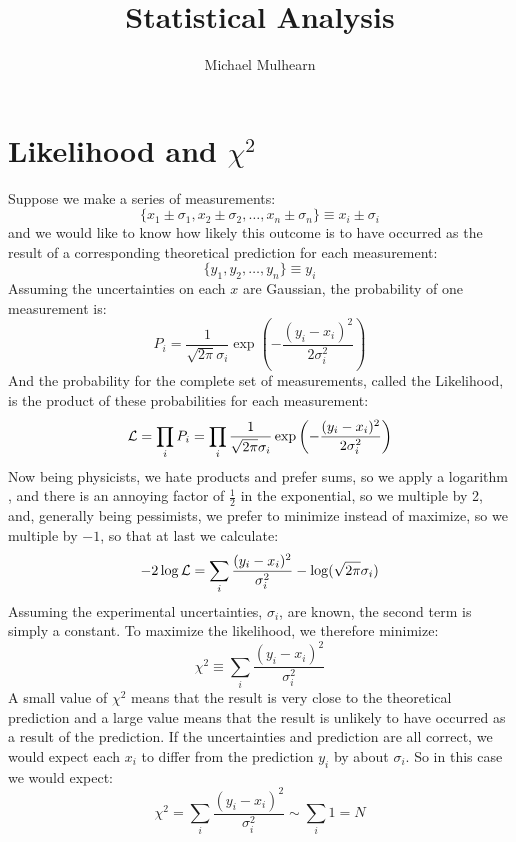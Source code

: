 \documentclass[12pt]{article}
\begin{document}
\title{Statistical Analysis}
\author{Michael Mulhearn}

\maketitle

\section{Likelihood and $\chi^2$}

Suppose we make a series of measurements:
\begin{displaymath}
\{x_1 \pm \sigma_1, x_2 \pm \sigma_2, \ldots, x_n \pm \sigma_n \} \equiv x_i \pm \sigma_i
\end{displaymath}
and we would like to know how likely this outcome is to have occurred as the result of a corresponding theoretical prediction for each measurement:
\begin{displaymath}
\{y_1, y_2, \ldots, y_n \} \equiv y_i
\end{displaymath}
Assuming the uncertainties on each $x$ are Gaussian, the probability of one measurement is:
\begin{displaymath}
P_i = \frac{1}{\sqrt{2 \pi} \sigma_i}  \exp\left( - \frac{(y_i-x_i)^2}{2\sigma_i^2}\right)
\end{displaymath}
And the probability for the complete set of measurements, called the Likelihood, is the product of these probabilities for each measurement:
\begin{displaymath}
{\cal L} = \prod_i P_i = \prod_i \frac{1}{\sqrt{2 \pi} \sigma_i}  \exp\left( - \frac{(y_i-x_i)^2}{2\sigma_i^2}\right)
\end{displaymath}
Now being physicists, we hate products and prefer sums, so we apply a logarithm , and there is an annoying factor of $\frac{1}{2}$ in the exponential, so we multiple by 2, and, generally being pessimists, we prefer to minimize instead of maximize, so we multiple by $-1$, so that at last 
we calculate:
\begin{equation}
-2 \log {\cal L} = \sum_i \frac{(y_i-x_i)^2}{\sigma_i^2} - \log(\sqrt{2\pi}\sigma_i)
\end{equation}
Assuming the experimental uncertainties, $\sigma_i$, are known, the second term is simply a constant.  To maximize the likelihood, we therefore 
minimize:
\begin{equation}
\chi^2 \equiv \sum_i \frac{(y_i-x_i)^2}{\sigma_i^2} 
\end{equation}
A small value of $\chi^2$ means that the result is very close to the theoretical prediction and a large value means that the result is unlikely to have occurred as a result of the prediction.  If the uncertainties and prediction are all correct, we would expect each $x_i$ to differ from the prediction $y_i$ by about $\sigma_i$.  So in this case we would expect:
\begin{equation}
\chi^2 = \sum_i \frac{(y_i-x_i)^2}{\sigma_i^2} \sim \sum_i 1 = N
\end{equation}
\end{document}

